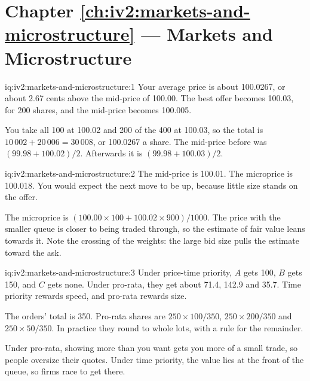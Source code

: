 \section*{Chapter \ref{ch:iv2:markets-and-microstructure} --- Markets and Microstructure}

\begin{solution}{iq:iv2:markets-and-microstructure:1}
Your average price is about 100.0267, or about 2.67 cents above the mid-price of 100.00. The best offer becomes 100.03, for 200 shares, and the mid-price becomes 100.005.

You take all 100 at 100.02 and 200 of the 400 at 100.03, so the total is $10\,002 + 20\,006 = 30\,008$, or 100.0267 a share. The mid-price before was $(99.98 + 100.02)/2$. Afterwards it is $(99.98 + 100.03)/2$.

\end{solution}

\begin{solution}{iq:iv2:markets-and-microstructure:2}
The mid-price is 100.01. The microprice is 100.018. You would expect the next move to be up, because little size stands on the offer.

The microprice is $(100.00 \times 100 + 100.02 \times 900)/1000$. The price with the smaller queue is closer to being traded through, so the estimate of fair value leans towards it. Note the crossing of the weights: the large bid size pulls the estimate toward the ask.

\end{solution}

\begin{solution}{iq:iv2:markets-and-microstructure:3}
Under price-time priority, $A$ gets 100, $B$ gets 150, and $C$ gets none. Under pro-rata, they get about 71.4, 142.9 and 35.7. Time priority rewards speed, and pro-rata rewards size.

The orders' total is 350. Pro-rata shares are $250 \times 100/350$, $250 \times 200/350$ and $250 \times 50/350$. In practice they round to whole lots, with a rule for the remainder.

Under pro-rata, showing more than you want gets you more of a small trade, so people oversize their quotes. Under time priority, the value lies at the front of the queue, so firms race to get there.

\end{solution}

